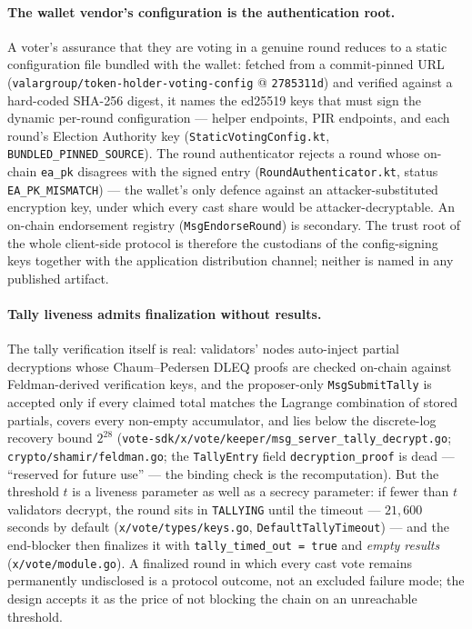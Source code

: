 \documentclass[11pt,a4paper]{article}
\theoremstyle{definition}
\begin{document}
\paragraph{The wallet vendor's configuration is the authentication root.}
A voter's assurance that they are voting in a genuine round reduces to a
static configuration file bundled with the wallet: fetched from a
commit-pinned URL (\texttt{valargroup/token-holder-voting-config} @
\texttt{2785311d}) and verified against a hard-coded SHA-256 digest, it
names the ed25519 keys that must sign the dynamic per-round
configuration --- helper endpoints, PIR endpoints, and each round's
Election Authority key (\texttt{StaticVotingConfig.kt},
\texttt{BUNDLED\_PINNED\_SOURCE}). The round authenticator rejects a round
whose on-chain \texttt{ea\_pk} disagrees with the signed entry
(\texttt{RoundAuthenticator.kt}, status \texttt{EA\_PK\_MISMATCH}) --- the
wallet's only defence against an attacker-substituted encryption key,
under which every cast share would be attacker-decryptable. An on-chain
endorsement registry (\texttt{MsgEndorseRound}) is secondary. The trust
root of the whole client-side protocol is therefore the custodians of the
config-signing keys together with the application distribution channel;
neither is named in any published artifact.

\paragraph{Tally liveness admits finalization without results.} The tally
verification itself is real: validators' nodes auto-inject partial
decryptions whose Chaum--Pedersen DLEQ proofs are checked on-chain against
Feldman-derived verification keys, and the proposer-only
\texttt{MsgSubmitTally} is accepted only if every claimed total matches
the Lagrange combination of stored partials, covers every non-empty
accumulator, and lies below the discrete-log recovery bound $2^{28}$
(\texttt{vote-sdk/x/vote/keeper/msg\_server\_tally\_decrypt.go};
\texttt{crypto/shamir/feldman.go}; the \texttt{TallyEntry} field
\texttt{decryption\_proof} is dead --- ``reserved for future use'' --- the
binding check is the recomputation). But the threshold $t$ is a liveness
parameter as well as a secrecy parameter: if fewer than $t$ validators
decrypt, the round sits in \texttt{TALLYING} until the timeout ---
$21{,}600$ seconds by default (\texttt{x/vote/types/keys.go},
\texttt{DefaultTallyTimeout}) --- and the end-blocker then finalizes it
with \texttt{tally\_timed\_out = true} and \emph{empty results}
(\texttt{x/vote/module.go}). A finalized round in which every cast vote
remains permanently undisclosed is a protocol outcome, not an excluded
failure mode; the design accepts it as the price of not blocking the
chain on an unreachable threshold.
\end{document}
